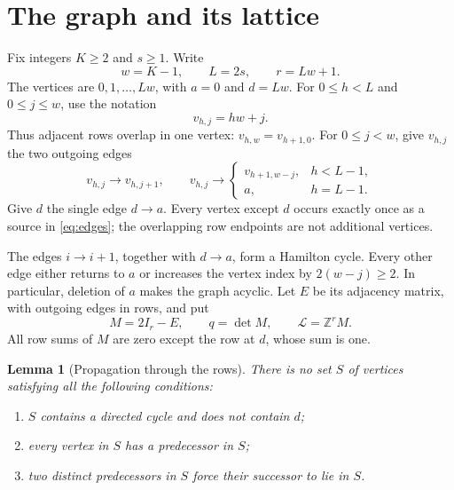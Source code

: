 \documentclass[reqno]{amsart}
\newtheorem{lemma}[theorem]{Lemma}
\theoremstyle{remark}
\newcommand{\Z}{\mathbb Z}
\numberwithin{equation}{section}
\begin{document}
\section{The graph and its lattice}

Fix integers $K\geq2$ and $s\geq1$. Write
\[
 w=K-1,\qquad L=2s,\qquad r=Lw+1.
\]
The vertices are $0,1,\ldots,Lw$, with $a=0$ and $d=Lw$.
For $0\leq h<L$ and $0\leq j\leq w$, use the notation
\[
 v_{h,j}=hw+j.
\]
Thus adjacent rows overlap in one vertex:
$v_{h,w}=v_{h+1,0}$. For $0\leq j<w$, give $v_{h,j}$ the two outgoing edges
\begin{equation}\label{eq:edges}
 v_{h,j}\longrightarrow v_{h,j+1},\qquad
 v_{h,j}\longrightarrow
 \begin{cases}
 v_{h+1,w-j},&h<L-1,\\
 a,&h=L-1.
 \end{cases}
\end{equation}
Give $d$ the single edge $d\to a$.
Every vertex except $d$ occurs exactly once as a source in
\eqref{eq:edges}; the overlapping row endpoints are not additional vertices.

The edges $i\to i+1$, together with $d\to a$, form a Hamilton cycle.
Every other edge either returns to $a$ or increases the vertex index by
$2(w-j)\geq2$. In particular, deletion of $a$ makes the graph acyclic.
Let $E$ be its adjacency matrix, with outgoing edges in rows, and put
\[
 M=2I_r-E,\qquad q=\det M,\qquad \mathcal L=\Z^rM.
\]
All row sums of $M$ are zero except the row at $d$, whose sum is one.

\begin{lemma}[Propagation through the rows]\label{lem:propagation}
There is no set $S$ of vertices satisfying all the following conditions:
\begin{enumerate}
\item $S$ contains a directed cycle and does not contain $d$;
\item every vertex in $S$ has a predecessor in $S$;
\item two distinct predecessors in $S$ force their successor to lie in $S$.
\end{enumerate}
\end{lemma}
\end{document}

